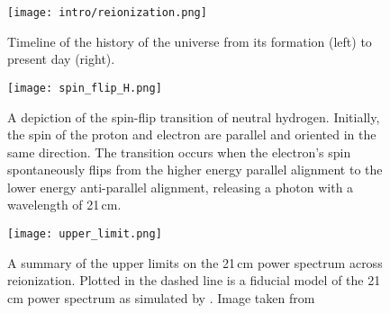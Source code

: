 

\begin{figure}[th]
	\centering
	\texttt{[image: intro/reionization.png]}
	\caption[Epoch of Reionization Timeline]{Timeline of the history of the universe from its formation (left) to present day (right).}
	\label{fig:timeline}
\end{figure}



\begin{figure}[th]
	\centering
	\texttt{[image: spin\_flip\_H.png]}
	\caption[Spin-Flip Transition of Neutral Hydrogen]{A depiction of the spin-flip transition of neutral hydrogen. Initially,
																					 the spin of the proton and electron are parallel and oriented
																					 in the same direction. The transition occurs when the electron's spin spontaneously
																					 flips from the higher energy parallel alignment to the lower energy anti-parallel alignment,
																					 releasing a photon with a wavelength of 21\,cm.}
	\label{fig:spin_flip}
\end{figure}

\begin{figure}[th]
	\centering
	\texttt{[image: upper\_limit.png]}
	\caption[Upper Limits on Reionization]{A summary of the upper limits on the 21\,cm power spectrum across reionization. Plotted in the dashed line is a fiducial model of the 21\,cm power spectrum as simulated by \fastsim. Image taken from \cite{2019arXiv190708211L}}
	\label{fig:upper_limit}
\end{figure}
